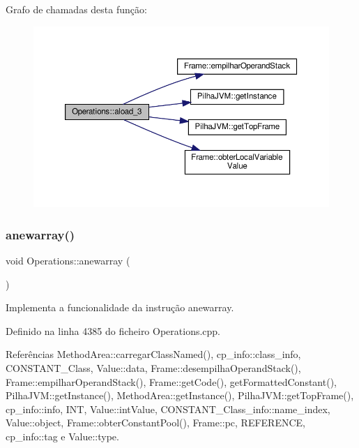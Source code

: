 Grafo de chamadas desta função\+:
\nopagebreak
\begin{figure}[H]
\begin{center}
\leavevmode
\includegraphics[width=350pt]{classOperations_ac0cadd4fe7c17eab1985f11b5389fafc_cgraph}
\end{center}
\end{figure}
\mbox{\label{classOperations_aa5110e66aa565e9130be292935ef5c71}} 
\subsubsection{\texorpdfstring{anewarray()}{anewarray()}}
{\footnotesize\ttfamily void Operations\+::anewarray (\begin{DoxyParamCaption}{ }\end{DoxyParamCaption})\hspace{0.3cm}{\ttfamily [private]}}



Implementa a funcionalidade da instrução anewarray. 



Definido na linha 4385 do ficheiro Operations.\+cpp.



Referências Method\+Area\+::carregar\+Class\+Named(), cp\+\_\+info\+::class\+\_\+info, C\+O\+N\+S\+T\+A\+N\+T\+\_\+\+Class, Value\+::data, Frame\+::desempilha\+Operand\+Stack(), Frame\+::empilhar\+Operand\+Stack(), Frame\+::get\+Code(), get\+Formatted\+Constant(), Pilha\+J\+V\+M\+::get\+Instance(), Method\+Area\+::get\+Instance(), Pilha\+J\+V\+M\+::get\+Top\+Frame(), cp\+\_\+info\+::info, I\+NT, Value\+::int\+Value, C\+O\+N\+S\+T\+A\+N\+T\+\_\+\+Class\+\_\+info\+::name\+\_\+index, Value\+::object, Frame\+::obter\+Constant\+Pool(), Frame\+::pc, R\+E\+F\+E\+R\+E\+N\+CE, cp\+\_\+info\+::tag e Value\+::type.



